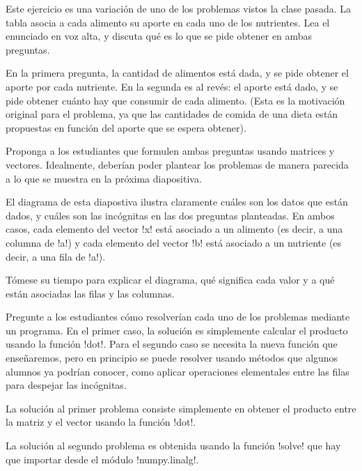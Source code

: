 \documentclass[10pt]{article}
\begin{document}
  Este ejercicio es una variación de uno de los problemas vistos
  la clase pasada. La tabla asocia a cada alimento su aporte
  en cada uno de los nutrientes.
  Lea el enunciado en voz alta,
  y discuta qué es lo que se pide obtener en ambas preguntas.

  En la primera pregunta, la cantidad de alimentos está dada,
  y se pide obtener el aporte por cada nutriente.
  En la segunda es al revés: el aporte está dado,
  y se pide obtener cuánto hay que consumir de cada alimento.
  (Esta es la motivación original para el problema,
  ya que las cantidades de comida de una dieta
  están propuestas en función del aporte que se espera obtener).

  Proponga a los estudiantes que formulen ambas preguntas
  usando matrices y vectores.
  Idealmente,
  deberían poder plantear los problemas
  de manera parecida a lo que se muestra en la próxima diapositiva.


  El diagrama de esta diapostiva
  ilustra claramente cuáles son los datos que están dados,
  y cuáles son las incógnitas en las dos preguntas planteadas.
  En ambos casos,
  cada elemento del vector \li!x! está asociado a un alimento
  (es decir, a una columna de \li!a!)
  y cada elemento del vector \li!b! está asociado a un nutriente
  (es decir, a una fila de \li!a!).

  Tómese su tiempo para explicar el diagrama,
  qué significa cada valor
  y a qué están asociadas las filas y las columnas.

  Pregunte a los estudiantes
  cómo resolverían cada uno de los problemas mediante un programa.
  En el primer caso,
  la solución es simplemente calcular el producto usando la función \li!dot!.
  Para el segundo caso se necesita la nueva función que enseñaremos,
  pero en principio se puede resolver usando métodos que algunos alumnos
  ya podrían conocer, como aplicar operaciones elementales entre las filas
  para despejar las incógnitas.


  La solución al primer problema
  consiste simplemente en obtener el producto entre la matriz y el vector
  usando la función \li!dot!.


  La solución al segundo problema
  es obtenida usando la función \li!solve!
  que hay que importar desde el módulo \li!numpy.linalg!.
\end{document}
